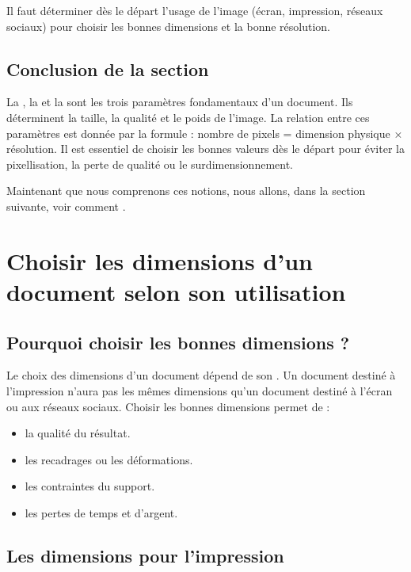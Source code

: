 Il faut déterminer dès le départ l'usage de l'image (écran, impression, réseaux sociaux) pour choisir les bonnes dimensions et la bonne résolution.

\subsection*{Conclusion de la section}

La , la  et la  sont les trois paramètres fondamentaux d'un document. Ils déterminent la taille, la qualité et le poids de l'image. La relation entre ces paramètres est donnée par la formule : nombre de pixels = dimension physique × résolution. Il est essentiel de choisir les bonnes valeurs dès le départ pour éviter la pixellisation, la perte de qualité ou le surdimensionnement.

Maintenant que nous comprenons ces notions, nous allons, dans la section suivante, voir comment .

\section{Choisir les dimensions d'un document selon son utilisation}

\subsection{Pourquoi choisir les bonnes dimensions ?}

Le choix des dimensions d'un document dépend de son . Un document destiné à l'impression n'aura pas les mêmes dimensions qu'un document destiné à l'écran ou aux réseaux sociaux. Choisir les bonnes dimensions permet de :

\begin{itemize}
    \item {} la qualité du résultat.
    \item {} les recadrages ou les déformations.
    \item {} les contraintes du support.
    \item {} les pertes de temps et d'argent.
\end{itemize}

\subsection{Les dimensions pour l'impression}

